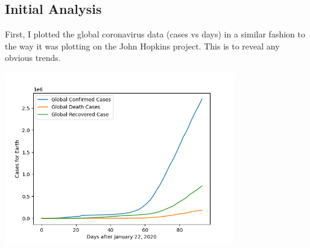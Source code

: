 \documentclass{article}
\begin{document}
        \subsection{Initial Analysis}
            First, I plotted the global coronavirus data (cases vs days) in a similar fashion to the way it was plotting on the John Hopkins project. This is to reveal any obvious trends.
            \begin{center}
                \includegraphics[width=10cm]{plots/global/cases.png}
            \end{center}
            
\end{document}
